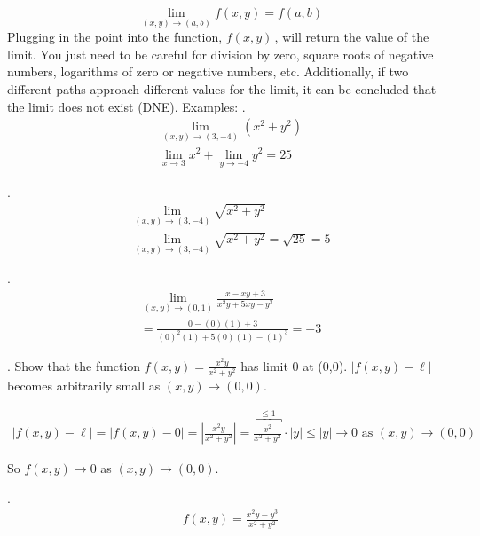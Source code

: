 \documentclass{article}
\newcommand{\n}{\leavevmode \newline} %
\newcommand{\nn}{\leavevmode \newline \newline} %
\newcommand{\limxyto}[2]{\lim_{(x,y)\to(#1,#2)}} %
\newcommand{\fxy}{$f(x,y)\,$} %
\newcommand{\as}{\text{ as }} %
\numberwithin{equation}{subsection} %
\begin{document}
\begin{equation}
    \limxyto{a}{b}f(x,y)=f(a,b)
\end{equation}
\n
Plugging in the point into the function, \fxy, will return the value of the limit. You just need to be careful for division by zero, square roots of negative numbers, logarithms of zero or negative numbers, etc. Additionally, if two different paths approach different values for the limit, it can be concluded that the limit does not exist (DNE).
\nn
Examples:
\nn
{}. 
\begin{equation}
    \begin{split}
        \limxyto{3}{-4}(x^2+y^2)\\
        \lim_{x\to3}x^2+\lim_{y\to-4}y^2=25
    \end{split}
\end{equation}

.
\begin{equation}
    \begin{split}
        \limxyto{3}{-4}\sqrt{x^2+y^2}\\
        \limxyto{3}{-4}\sqrt{x^2+y^2}=\sqrt{25}=5
    \end{split}
\end{equation}

.
\begin{equation}
    \begin{split}
        \limxyto{0}{1}\frac{x-xy+3}{x^2y+5xy-y^3}\\
        =\frac{0-(0)(1)+3}{(0)^2(1)+5(0)(1)-(1)^3}=-3
    \end{split}
\end{equation}

. Show that the function $f(x,y)=\frac{x^2y}{x^2+y^2}$ has limit 0 at (0,0). $|f(x,y)-\ell|$ becomes arbitrarily small as $(x,y)\rightarrow(0,0)$.

\begin{equation}
    \begin{split}
        |f(x,y)-\ell|=|f(x,y)-0|=\left|\frac{x^2y}{x^2+y^2}\right|=\overbracket{\frac{x^2}{x^2+y^2}}^{\leq 1}\cdot|y|\leq|y|\rightarrow 0\as (x,y)\rightarrow(0,0)
    \end{split}
\end{equation}

So $f(x,y)\rightarrow 0$ as $(x,y)\rightarrow(0,0)$.

.
\begin{equation}
    \begin{split}
        f(x,y)=\frac{x^2y-y^3}{x^2+y^2}
    \end{split}
\end{equation}
\end{document}
